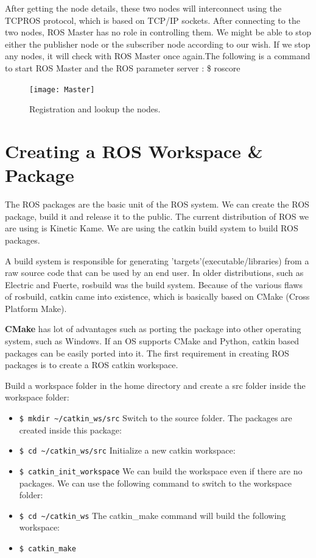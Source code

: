 	 After getting the node details, these two nodes will interconnect using the TCPROS protocol, which is based on TCP/IP sockets. After connecting to the two nodes, ROS Master has no role in controlling them. We might be able to stop either the publisher node or the subscriber node according to our wish. If we stop any nodes, it will check with ROS Master once again.The following is a command to start ROS Master and the ROS parameter server : \$ roscore
	 
	 \begin{figure}[h]		
	 	\centering
	 	\texttt{[image: Master]}
	 	\caption{Registration and lookup the nodes.}
	 	\label{Fig:Master}
	 \end{figure}
 
\section{Creating a ROS Workspace \& Package}
 The ROS packages are the basic unit of the ROS system. We can create the ROS package, build it and release it to the public. The current distribution of ROS we are using is Kinetic Kame. We are using the catkin build system to build ROS packages.
 
 A build system is responsible for generating 'targets'(executable/libraries) from a raw source code that can be used by an end user. In older distributions, such as Electric and Fuerte, rosbuild was the build system. Because of the various flaws of rosbuild, catkin came into existence, which is basically based on CMake (Cross Platform Make).
 
 \textbf{CMake} has lot of advantages such as porting the package into other operating system, such as Windows. If an OS supports CMake and Python, catkin based packages can be easily ported into it. The first requirement in creating ROS packages is to create a ROS catkin workspace.
 
 Build a workspace folder in the home directory and create a src folder inside the workspace folder:
 \begin{itemize}
 	\item \lstinline|$ mkdir ~/catkin_ws/src|
 	Switch to the source folder. The packages are created inside this package:
 	\item \lstinline|$ cd ~/catkin_ws/src|
 	Initialize a new catkin workspace:
 	\item \lstinline|$ catkin_init_workspace|
	We can build the workspace even if there are no packages. We can use the following command to switch to the workspace folder:
 	\item \lstinline|$ cd ~/catkin_ws|
 	The catkin\_make command will build the following workspace:
 	\item \lstinline|$ catkin_make|
 \end{itemize}

